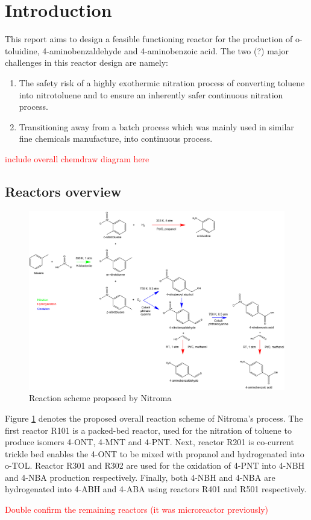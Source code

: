 \section{Introduction}
This report aims to design a feasible functioning reactor for the production of o-toluidine, 4-aminobenzaldehyde and 4-aminobenzoic acid. The two (?) major challenges in this reactor design are namely:
\begin{enumerate}
    \item The safety risk of a highly exothermic nitration process of converting toluene into nitrotoluene and to ensure an inherently safer continuous nitration process. 
    \item Transitioning away from a batch process which was mainly used in similar fine chemicals manufacture, into continuous process. 
\end{enumerate}




\textcolor{red}{include overall chemdraw diagram here} %
\subsection{Reactors overview}
\begin{figure}[h]
    \centering
    \includegraphics[width=\linewidth]{chapters/2-reaction/figures/routes-chosen_20210220.png}
    \caption{Reaction scheme proposed by Nitroma}
    \label{fig:finalroutes}
\end{figure}
Figure \ref{fig:finalroutes} denotes the proposed overall reaction scheme of Nitroma's process. The first reactor R101 is a packed-bed reactor, used for the nitration of toluene to produce isomers 4-ONT, 4-MNT and 4-PNT. Next, reactor R201 is co-current trickle bed enables the 4-ONT to be mixed with propanol and hydrogenated into o-TOL. Reactor R301 and R302 are used for the oxidation of 4-PNT into 4-NBH and 4-NBA production respectively. Finally, both 4-NBH and 4-NBA are hydrogenated into 4-ABH and 4-ABA using reactors R401 and R501 respectively. 



\textcolor{red}{Double confirm the remaining reactors (it was microreactor previously)} 




